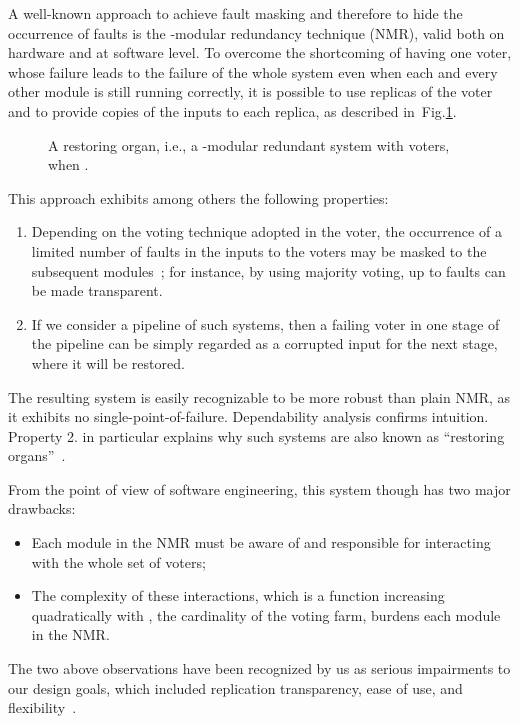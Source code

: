 \documentclass[11pt]{article}
\begin{document}
A well-known approach to achieve fault masking and therefore
to hide the occurrence of faults is the -modular redundancy
technique (NMR), valid both on hardware and at software level.
To overcome the shortcoming of having one voter, whose failure
leads to the failure of the whole system even when each and every
other module is still running correctly, it is possible to use 
replicas of the voter and to provide  copies of the inputs
to each replica, as described in~Fig.\ref{ro}.
\begin{figure}
\centerline{}
\caption{A restoring organ, i.e., a -modular redundant
system with  voters, when .}
\label{ro}
\end{figure}
This approach exhibits among others the following properties:
\begin{enumerate}
\item Depending on the voting technique adopted in the voter,
the occurrence of a limited number of faults in the inputs to the
voters may be masked to the subsequent modules~\cite{LoCE89};
for instance, by using majority voting, up to  faults can
be made transparent.
\item If we consider a pipeline of such systems, then a failing voter
in one stage of the pipeline can be simply regarded as a corrupted
input for the next stage, where it will be restored.
\end{enumerate}
The resulting system is easily recognizable to be more robust
than plain NMR, as it exhibits no single-point-of-f{}ailure.
Dependability analysis confirms intuition.
Property 2. in particular explains why such systems are
also known as ``restoring organs''~\cite{John89a}.



From the point of view of software engineering, this system 
though has two major drawbacks:
\begin{itemize}
\item Each module in the NMR{} must be aware of and responsible for 
interacting with the whole set of voters;
\item The complexity of these interactions, which is a function increasing
quadratically with , the cardinality of the voting farm, 
burdens each module in the NMR.
\end{itemize}

The two above observations have been recognized by us as serious
impairments to our design goals, which included
replication transparency, ease of use, and flexibility~\cite{DeDL98a}.
\end{document}
